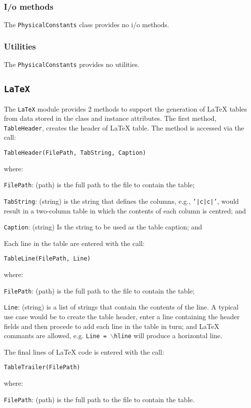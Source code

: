 \subsubsection{I/o methods}
\noindent
The \texttt{PhysicalConstants} class provides no i/o methods.

\subsubsection{Utilities}
\noindent
The \texttt{PhysicalConstants} provides no utilities.

\FloatBarrier

\subsection{\texttt{LaTeX}}
\label{SubSect:LTX}

The \texttt{LaTeX} module provides 2 methods to support the generation
of LaTeX tables from data stored in the class and instance attributes.
The first method, \texttt{TableHeader}, creates the header of LaTeX
table.
The method is accessed via the call:
\begin{center}
  \texttt{TableHeader(FilePath, TabString, Caption)}
\end{center}
where:
\begin{description}
  \item{\texttt{FilePath}}: (path) is the full path to the file to
    contain the table;
  \item{\texttt{TabString}}: (string) is the string that defines the
    columns, e.g., \texttt{'|c|c|'}, would result in a two-column
    table in which the contents of each column is centred; and
  \item{\texttt{Caption}}: (string) Is the string to be used as the
    table caption; and
\end{description}
Each line in the table are entered with the call:
\begin{center}
  \texttt{TableLine(FilePath, Line)}
\end{center}
where:
\begin{description}
  \item{\texttt{FilePath}}: (path) is the full path to the file to
    contain the table;
  \item{\texttt{Line}}: (string) is a list of strings that contain the
    contents of the line.
    A typical use case would be to create the table header, enter a
    line containing the header fields and then procede to add each
    line in the table in turn; and
    LaTeX commants are allowed, e.g. \texttt{Line = $\backslash$hline}
    will produce a horizontal line.
\end{description}
The final lines of LaTeX code is entered with the call:
\begin{center}
  \texttt{TableTrailer(FilePath)}
\end{center}
where:
\begin{description}
  \item{\texttt{FilePath}}: (path) is the full path to the file to
    contain the table.
\end{description}

\FloatBarrier
